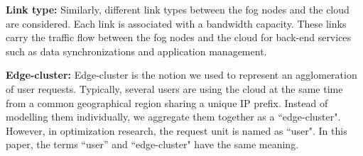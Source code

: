 \documentclass[10pt,journal,compsoc]{IEEEtran}
\begin{document}
\textbf{Link type: }Similarly, different link types between the fog nodes and the  cloud are considered. Each link is associated with a bandwidth capacity. These links carry the traffic flow between the fog nodes and the cloud for back-end services such as data synchronizations and application management.

\textbf{Edge-cluster: }Edge-cluster is the notion we used to represent an agglomeration of user requests. Typically, several users are using the cloud at the same time from a common geographical region sharing a unique IP prefix. Instead of modelling them individually, we aggregate them together as a ``edge-cluster". However, in optimization research, the request unit is named as ``user". In this paper, the terms ``user'' and ``edge-cluster" have the same meaning.

\end{document}
